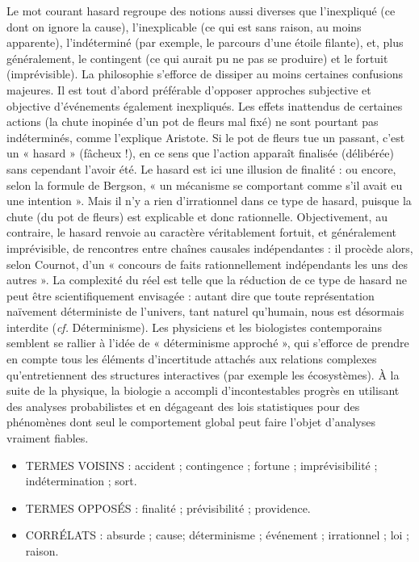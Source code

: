 Le mot courant hasard regroupe des
notions aussi diverses que l’inexpliqué
(ce dont on ignore la cause), l’inexplicable (ce qui est sans raison, au moins
apparente), l’indéterminé (par exemple,
le parcours d’une étoile filante), et, plus
généralement, le contingent (ce qui
aurait pu ne pas se produire) et le fortuit
(imprévisible). La philosophie s'efforce
de dissiper au moins certaines confusions majeures. Il est tout d’abord préférable d'opposer approches subjective
et objective d'événements également
inexpliqués. Les effets inattendus de certaines actions (la chute inopinée d’un
pot de fleurs mal fixé) ne sont pourtant
pas indéterminés, comme l'explique
Aristote. Si le pot de fleurs tue un passant, c’est un « hasard » (fâcheux !), en ce
sens que l’action apparaît finalisée (délibérée) sans cependant l'avoir été. Le
hasard est ici une illusion de finalité :
ou encore, selon la formule de Bergson, « un mécanisme se comportant
comme s'il avait eu une intention ». Mais
il n'y a rien d’irrationnel dans ce type de
hasard, puisque la chute (du pot de fleurs) est explicable et donc rationnelle.
%
Objectivement, au contraire, le hasard
renvoie au caractère véritablement fortuit, et généralement imprévisible, de
rencontres entre chaînes causales indépendantes : il procède alors, selon Cournot, d’un « concours de faits rationnellement indépendants les uns des
autres ». La complexité du réel est telle
que la réduction de ce type de hasard
ne peut être scientifiquement envisagée : autant dire que toute représentation naïvement déterministe de l'univers,
tant naturel qu'humain, nous est désormais interdite ({\it cf.} Déterminisme). Les
physiciens et les biologistes contemporains semblent se rallier à l’idée de
« déterminisme approché », qui s'efforce
de prendre en compte tous les éléments
d'incertitude attachés aux relations
complexes qu'entretiennent des structures interactives (par exemple les écosystèmes). À la suite de la physique, la
biologie a accompli d’incontestables
progrès en utilisant des analyses probabilistes et en dégageant des lois statistiques pour des phénomènes dont seul
le comportement global peut faire l’objet
d'analyses vraiment fiables.

\begin{itemize}[leftmargin=1cm, label=, itemsep=1pt]
\item {\footnotesize TERMES VOISINS} : accident ; contingence ; fortune ; imprévisibilité ; indétermination ; sort.
\item {\footnotesize TERMES OPPOSÉS} : finalité ; prévisibilité ; providence.
\item {\footnotesize CORRÉLATS} : absurde ; cause; déterminisme ; événement ; irrationnel ; loi ; raison.
\end{itemize}

